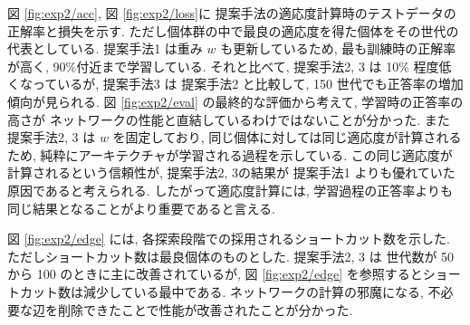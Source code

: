 図 \ref{fig:exp2/acc}, 図 \ref{fig:exp2/loss}に
提案手法の適応度計算時のテストデータの正解率と損失を示す.
ただし個体群の中で最良の適応度を得た個体をその世代の代表としている.
提案手法1 は重み $w$ も更新しているため, 最も訓練時の正解率が高く, 90\%付近まで学習している.
それと比べて, 提案手法2, 3 は 10\% 程度低くなっているが,
提案手法3 は 提案手法2 と比較して, 150 世代でも正答率の増加傾向が見られる.
図 \ref{fig:exp2/eval} の最終的な評価から考えて, 学習時の正答率の高さが
ネットワークの性能と直結しているわけではないことが分かった.
また 提案手法2, 3 は $w$ を固定しており, 同じ個体に対しては同じ適応度が計算されるため,
純粋にアーキテクチャが学習される過程を示している.
この同じ適応度が計算されるという信頼性が, 提案手法2, 3の結果が 提案手法1 よりも優れていた
原因であると考えられる.
したがって適応度計算には, 学習過程の正答率よりも同じ結果となることがより重要であると言える.

図 \ref{fig:exp2/edge} には, 各探索段階での採用されるショートカット数を示した.
ただしショートカット数は最良個体のものとした.
提案手法2, 3 は 世代数が 50 から 100 のときに主に改善されているが,
図 \ref{fig:exp2/edge} を参照するとショートカット数は減少している最中である.
ネットワークの計算の邪魔になる, 不必要な辺を削除できたことで性能が改善されたことが分かった.


